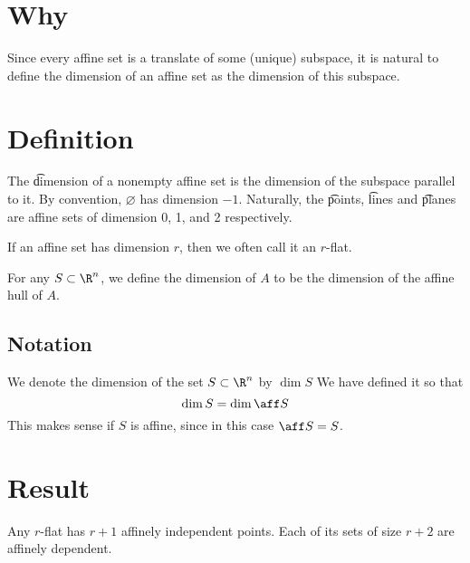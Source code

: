 
\section*{Why}

Since every affine set is a translate of some (unique) subspace, it is natural to define the dimension of an affine set as the dimension of this subspace.

\section*{Definition}

The \t{dimension} of a nonempty affine set is the dimension of the subspace parallel to it.
By convention, $\varnothing$ has dimension $-1$.
Naturally, the \t{points}, \t{lines} and \t{planes} are affine sets of dimension 0, 1, and 2 respectively.

If an affine set has dimension $r$, then we often call it an \t{$r$-flat}.

For any $S \subset \R ^n$, we define the dimension of $A$ to be the dimension of the affine hull of $A$.

\subsection*{Notation}

We denote the dimension of the set $S \subset \R ^n$ by $\dim S$
We have defined it so that
\[
\dim S = \dim \aff S
\]
This makes sense if $S$ is affine, since in this case $\aff S = S$.

\section*{Result}

\begin{proposition}
Any $r$-flat has $r+1$ affinely independent points.
Each of its sets of size $r+2$ are affinely dependent.
\end{proposition}

\blankpage